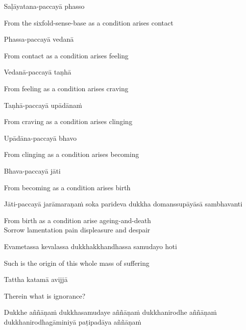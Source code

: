 Saḷāyatana-paccayā phasso

\begin{cprenglish}
From the sixfold-sense-base as a condition arises contact
\end{cprenglish}

Phassa-paccayā vedanā

\begin{cprenglish}
From contact as a condition arises feeling
\end{cprenglish}

Vedanā-paccayā taṇhā

\begin{cprenglish}
From feeling as a condition arises craving
\end{cprenglish}

Taṇhā-paccayā upādānaṁ

\begin{cprenglish}
From craving as a condition arises clinging
\end{cprenglish}

Upādāna-paccayā bhavo

\begin{cprenglish}
From clinging as a condition arises becoming
\end{cprenglish}

Bhava-paccayā jāti

\begin{cprenglish}
From becoming as a condition arises birth
\end{cprenglish}

Jāti-paccayā jarāmaraṇaṁ soka parideva dukkha domanssupāyāsā sambhavanti

\begin{cprenglish}
From birth as a condition arise ageing-and-death\\
Sorrow lamentation pain displeasure and despair
\end{cprenglish}

Evametassa kevalassa dukkhakkhandhassa samudayo hoti

\begin{cprenglish}
Such is the origin of this whole mass of suffering
\end{cprenglish}

Tattha katamā avijjā

\begin{cprenglish}
Therein what is ignorance?
\end{cprenglish}

Dukkhe aññāṇaṁ dukkhasamudaye aññāṇaṁ dukkhanirodhe aññāṇaṁ dukkhanirodhagāminiyā paṭipadāya aññāṇaṁ

